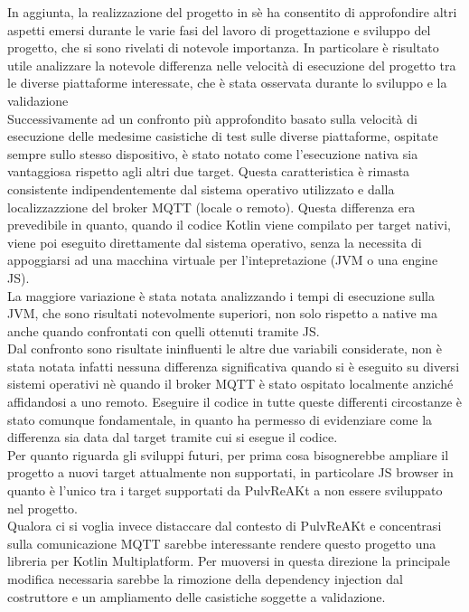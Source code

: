 \documentclass[12pt,a4paper,openright,twoside]{book}
\begin{document}
In aggiunta, la realizzazione del progetto in sè ha consentito di approfondire altri aspetti emersi durante le varie fasi del lavoro di progettazione e sviluppo del progetto, 
che si sono rivelati di notevole importanza. In particolare è risultato utile analizzare la notevole differenza nelle velocità di esecuzione del progetto tra le diverse 
piattaforme interessate, che è stata osservata durante lo sviluppo e la validazione \\
Successivamente ad un confronto più approfondito basato sulla velocità di esecuzione delle medesime casistiche di test sulle diverse piattaforme, 
ospitate sempre sullo stesso dispositivo, è stato notato come l'esecuzione nativa sia vantaggiosa rispetto agli altri due target.
Questa caratteristica è rimasta consistente indipendentemente dal sistema operativo utilizzato e dalla localizzazzione del broker \ac{MQTT} (locale o remoto).
Questa differenza era prevedibile in quanto, quando il codice Kotlin viene compilato per target nativi, viene poi eseguito direttamente dal sistema operativo, 
senza la necessita di appoggiarsi ad una macchina virtuale per l'intepretazione (\ac{JVM} o una engine \ac{JS}).\\
La maggiore variazione è stata notata analizzando i tempi di esecuzione sulla \ac{JVM}, che sono risultati notevolmente superiori, non solo rispetto a native 
ma anche quando confrontati con quelli ottenuti tramite \ac{JS}.\\
Dal confronto sono risultate ininfluenti le altre due variabili considerate, non è stata notata infatti nessuna differenza significativa quando si è eseguito su 
diversi sistemi operativi nè quando il broker \ac{MQTT} è stato ospitato localmente anziché affidandosi a uno remoto. Eseguire il codice in tutte queste differenti 
circostanze è stato comunque fondamentale, in quanto ha permesso di evidenziare come la differenza sia data dal target tramite cui si esegue il codice.\\

Per quanto riguarda gli sviluppi futuri, per prima cosa bisognerebbe ampliare il progetto a nuovi target attualmente non supportati, 
in particolare \ac{JS} browser in quanto è l'unico tra i target supportati da PulvReAKt a non essere sviluppato nel progetto.\\
Qualora ci si voglia invece distaccare dal contesto di PulvReAKt e concentrasi sulla comunicazione \ac{MQTT} sarebbe interessante rendere questo progetto 
una libreria per Kotlin Multiplatform. Per muoversi in questa direzione la principale modifica necessaria sarebbe la rimozione della dependency injection dal costruttore 
e un ampliamento delle casistiche soggette a validazione. 
\end{document}
